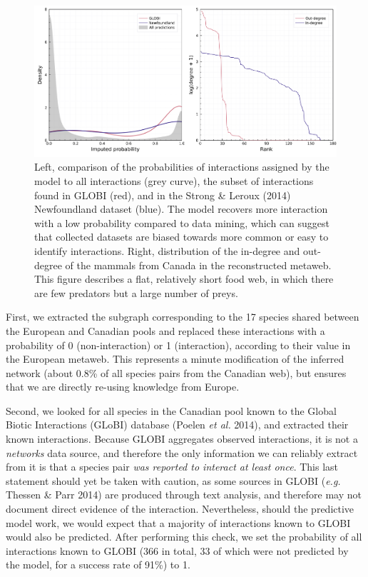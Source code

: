 \documentclass[11pt]{article}
\makeatletter
\def\maxwidth{\ifdim\Gin@nat@width>\linewidth\linewidth
\else\Gin@nat@width\fi}
\let\Oldincludegraphics\includegraphics
\renewcommand{\includegraphics}[1]{\Oldincludegraphics[width=\maxwidth]{#1}}
\makeatother
\begin{document}
\begin{figure}
\hypertarget{fig:inflation}{%
\centering
\includegraphics{figures/figure-validation.png}
\caption{Left, comparison of the probabilities of interactions assigned
by the model to all interactions (grey curve), the subset of
interactions found in GLOBI (red), and in the Strong \& Leroux (2014)
Newfoundland dataset (blue). The model recovers more interaction with a
low probability compared to data mining, which can suggest that
collected datasets are biased towards more common or easy to identify
interactions. Right, distribution of the in-degree and out-degree of the
mammals from Canada in the reconstructed metaweb. This figure describes
a flat, relatively short food web, in which there are few predators but
a large number of preys.}\label{fig:inflation}
}
\end{figure}

First, we extracted the subgraph corresponding to the 17 species shared
between the European and Canadian pools and replaced these interactions
with a probability of 0 (non-interaction) or 1 (interaction), according
to their value in the European metaweb. This represents a minute
modification of the inferred network (about 0.8\% of all species pairs
from the Canadian web), but ensures that we are directly re-using
knowledge from Europe.

Second, we looked for all species in the Canadian pool known to the
Global Biotic Interactions (GLoBI) database (Poelen \emph{et al.} 2014),
and extracted their known interactions. Because GLOBI aggregates
observed interactions, it is not a \emph{networks} data source, and
therefore the only information we can reliably extract from it is that a
species pair \emph{was reported to interact at least once}. This last
statement should yet be taken with caution, as some sources in GLOBI
(\emph{e.g.} Thessen \& Parr 2014) are produced through text analysis,
and therefore may not document direct evidence of the interaction.
Nevertheless, should the predictive model work, we would expect that a
majority of interactions known to GLOBI would also be predicted. After
performing this check, we set the probability of all interactions known
to GLOBI (366 in total, 33 of which were not predicted by the model, for
a success rate of 91\%) to 1.
\end{document}
